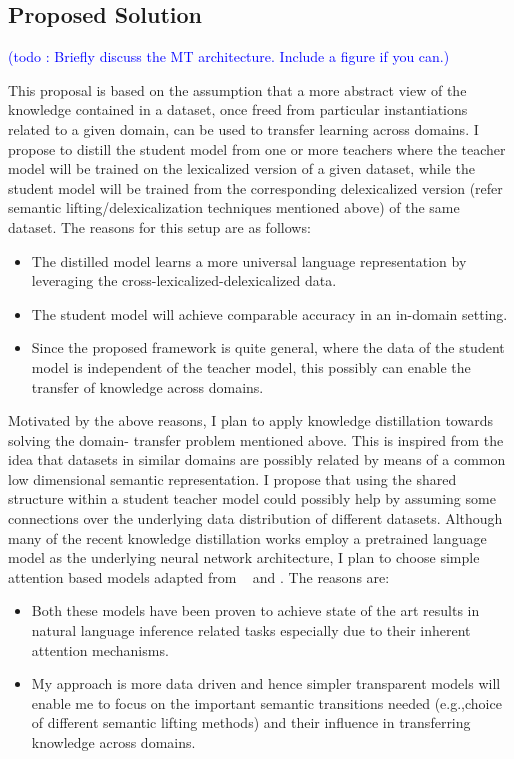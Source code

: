 \documentclass{article}
\newcommand\todo[1]{\textcolor{blue}{(todo : #1)}}
\begin{document}
\subsection{Proposed Solution}

\todo{Briefly discuss the MT architecture. Include a figure if you can.}



This proposal is based on the assumption that a more abstract view of the knowledge contained in a dataset, once freed from particular instantiations related to a given domain, can be used to transfer learning across domains. I propose to distill the student model from one or more teachers where the teacher model will be trained on the lexicalized version of a given dataset, while the student model will be trained from the corresponding delexicalized version (refer semantic lifting/delexicalization techniques mentioned above) of the same dataset. The reasons for this setup are as follows:


\begin{itemize}
  \item The distilled model learns a more universal language representation by leveraging the cross-lexicalized-delexicalized data.
  \item The student model will achieve comparable accuracy in an in-domain setting.
  \item Since the proposed framework is quite general, where the data of the student model is independent of the teacher model, this possibly can enable the transfer of knowledge across domains.
\end{itemize}

Motivated by the above reasons, I plan to apply knowledge distillation towards solving the domain- transfer problem mentioned above. This is inspired from the idea that datasets in similar domains are possibly related by means of a common low dimensional semantic representation. I propose that using the shared structure within a student teacher model could possibly help by assuming some connections over the underlying data distribution of different datasets. Although many of the recent knowledge distillation works \citep*{jiao2019tinybert,tang2019distilling,zhao2019extreme}  employ a  pretrained language model as the underlying neural network architecture, I plan to choose simple attention based models adapted from ~\citep*{parikh2016decomposable} and \citep*{chen2016enhanced}. The reasons are:

\begin{itemize}
  \item Both these models have been proven to achieve state of the art results in natural language inference related tasks especially due to their inherent attention mechanisms.
  \item My approach is more data driven and hence simpler transparent models will enable me to focus on the important semantic transitions needed (e.g.,choice of different semantic lifting methods) and their influence in transferring knowledge across domains.
 \end{itemize}
\end{document}

